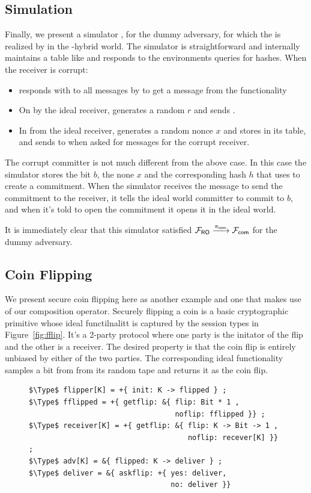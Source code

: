 \subsection{Simulation}
Finally, we present a simulator \simcom, for the dummy adversary, for which the \Fcom is realized by  in the \Fropp-hybrid world.
The simulator is straightforward and internally maintains a table like \Fro and responds to the environments queries for hashes. 
When the receiver is corrupt:
\begin{itemize}
\item \simcom responds with  to all messages by \Z to get a message from the functionality
\item On  by the ideal receiver, \simcom generates a random $r$ and sends .
\item In  from the ideal receiver, \simcom generates a random nonce $x$ and stores  in its \Fro table, and sends  to \Z when asked for messages for the corrupt receiver.
\end{itemize}

The corrupt committer is not much different from the above case. In this case
the simulator stores the bit $b$, the none $x$ and the corresponding hash $h$ that \Z uses to create a commitment.
When the simulator receives the message to send the commitment to the receiver, it tells the ideal world committer to commit to $b$, and when it's told to open the commitment it opens it in the ideal world. 

It is immediately clear that this simulator satisfied $\mathcal{F}_{{\mathsf {RO}}} \xrightarrow{\pi_{{\mathsf {com}}}} \mathcal{F}_{{\mathsf {com}}}$ for the dummy adversary.

\subsection{Coin Flipping}
We present secure coin flipping here as another example and one that makes use of our composition operator. 
Securely flipping a coin is a basic cryptographic primitive whose ideal functilnalitt \Fflip is captured by the session types in Figure~\ref{fig:fflip}.
It's a 2-party protocol where one party is the initator of the flip and the other is a receiver.
The desired property is that the coin flip is entirely unbiased by either of the two parties. The corresponding ideal functionality \Fflip samples a bit from from its random tape and returns it as the coin flip.
\begin{figure}
\centering
\begin{lstlisting}[basicstyle=\small\BeraMonottFamily, frame=single, mathescape]
$\Type$ flipper[K] = +{ init: K -> flipped } ;
$\Type$ fflipped = +{ getflip: &{ flip: Bit * 1 ,
                                  noflip: fflipped }} ;
$\Type$ receiver[K] = +{ getflip: &{ flip: K -> Bit -> 1 ,
                                     noflip: recever[K] }} ;
$\Type$ adv[K] = &{ flipped: K -> deliver } ;
$\Type$ deliver = &{ askflip: +{ yes: deliver,
                                 no: deliver }}
\end{lstlisting}
\end{figure}

